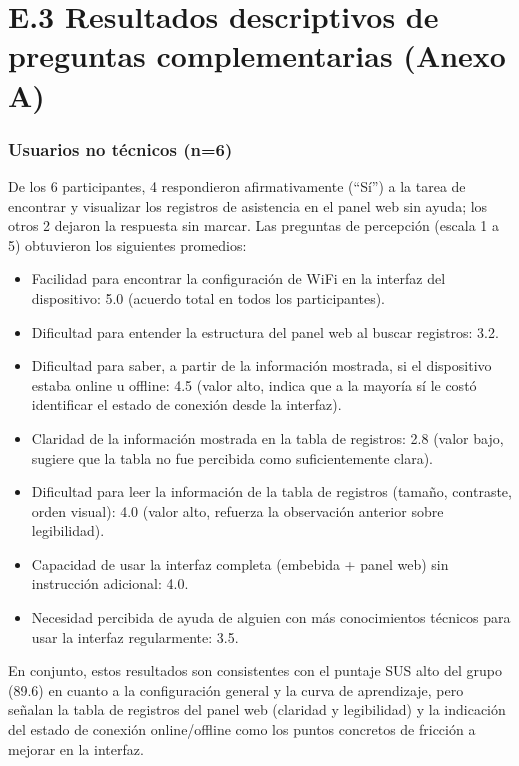 \documentclass{iccmemoria}
\begin{document}
\section*{E.3 Resultados descriptivos de preguntas complementarias (Anexo A)}

\subsubsection*{Usuarios no técnicos (n=6)}

De los 6 participantes, 4 respondieron afirmativamente (``Sí'') a la tarea de encontrar y visualizar los registros de asistencia en el panel web sin ayuda; los otros 2 dejaron la respuesta sin marcar. Las preguntas de percepción (escala 1 a 5) obtuvieron los siguientes promedios:

\begin{itemize}
    \item Facilidad para encontrar la configuración de WiFi en la interfaz del dispositivo: 5.0 (acuerdo total en todos los participantes).
    \item Dificultad para entender la estructura del panel web al buscar registros: 3.2.
    \item Dificultad para saber, a partir de la información mostrada, si el dispositivo estaba online u offline: 4.5 (valor alto, indica que a la mayoría sí le costó identificar el estado de conexión desde la interfaz).
    \item Claridad de la información mostrada en la tabla de registros: 2.8 (valor bajo, sugiere que la tabla no fue percibida como suficientemente clara).
    \item Dificultad para leer la información de la tabla de registros (tamaño, contraste, orden visual): 4.0 (valor alto, refuerza la observación anterior sobre legibilidad).
    \item Capacidad de usar la interfaz completa (embebida + panel web) sin instrucción adicional: 4.0.
    \item Necesidad percibida de ayuda de alguien con más conocimientos técnicos para usar la interfaz regularmente: 3.5.
\end{itemize}

En conjunto, estos resultados son consistentes con el puntaje SUS alto del grupo (89.6) en cuanto a la configuración general y la curva de aprendizaje, pero señalan la tabla de registros del panel web (claridad y legibilidad) y la indicación del estado de conexión online/offline como los puntos concretos de fricción a mejorar en la interfaz.
\end{document}
